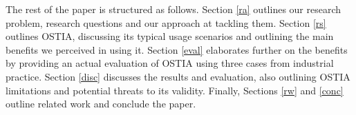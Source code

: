 The rest of the paper is structured as follows. Section \ref{ra} outlines our research problem, research questions and our approach at tackling them. Section \ref{rs} outlines OSTIA, discussing its typical usage scenarios and outlining the main benefits we perceived in using it. Section \ref{eval} elaborates further on the benefits by providing an actual evaluation of OSTIA using three cases from industrial practice. Section \ref{disc} discusses the results and evaluation, also outlining OSTIA limitations and potential threats to its validity. Finally, Sections \ref{rw} and \ref{conc} outline related work and conclude the paper.